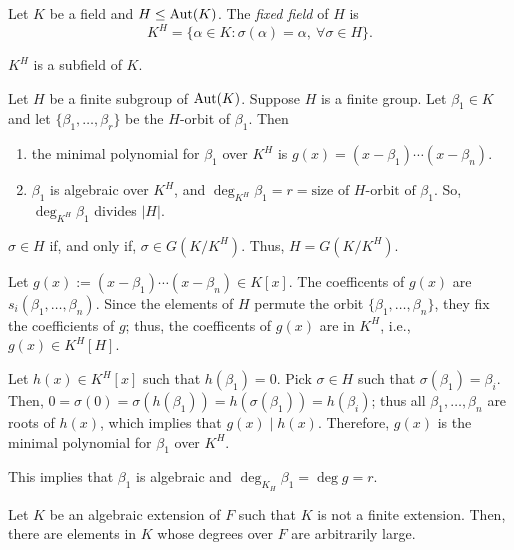 \begin{defn}
	Let $K$ be a field and $H \le \operatorname{Aut}(K)$. The \emph{fixed field} of $H$ is \[
		K^H = \{ \alpha \in K : \sigma(\alpha) = \alpha,\ \forall \sigma \in H\}.
	\]
\end{defn}

\begin{prop}
	$K^H$ is a subfield of $K$.
\end{prop}

\begin{thm}\label{l37:thm13}
	Let $H$ be a finite subgroup of $\operatorname{Aut}(K)$. Suppose $H$ is a finite group. Let $\beta_1 \in K$ and let $\{\beta_1, \dots, \beta_r\}$ be the $H$-orbit of $\beta_1$. Then
	\begin{enumerate}[label = (\alph*)]
		\item the minimal polynomial for $\beta_1$ over $K^H$ is $g(x) = (x-\beta_1)\cdots(x-\beta_n)$.
		\item $\beta_1$ is algebraic over $K^H$, and $\deg_{K^H}\beta_1 = r = \text{size of $H$-orbit of $\beta_1$}$. So, $\deg_{K^H}\beta_1$ divides $|H|$.
	\end{enumerate}
\end{thm}
	
\begin{rem}
	$\sigma \in H$ if, and only if, $\sigma \in G(K/K^H)$. Thus, $H = G(K/K^H)$.
\end{rem}

\begin{dem}
	Let $g(x) := (x - \beta_1)\cdots(x - \beta_n) \in K[x]$. The coefficents of $g(x)$ are $s_i(\beta_1, \dots, \beta_n)$. Since the elements of $H$ permute the orbit $\{\beta_1, \dots, \beta_n\}$, they fix the coefficients of $g$; thus, the coefficents of $g(x)$ are in $K^H$, i.e., $g(x) \in K^H[H]$.

	Let $h(x) \in K^H[x]$ such that $h(\beta_1) = 0$. Pick $\sigma \in H$ such that $\sigma(\beta_1) = \beta_i$. Then, $0 = \sigma(0) = \sigma(h(\beta_1)) = h(\sigma(\beta_1)) = h(\beta_i)$; thus all  $\beta_1, \dots, \beta_n$ are roots of $h(x)$, which implies that $g(x) \mid h(x)$. Therefore, $g(x)$ is the minimal polynomial for $\beta_1$ over $K^H$.

	This implies that $\beta_1$ is algebraic and $\deg_{K_H}\beta_1 = \deg g = r$.
\end{dem} 

\begin{lem}\label{l37:lem14}
	Let $K$ be an algebraic extension of $F$ such that $K$ is not a finite extension. Then, there are elements in $K$ whose degrees over $F$ are arbitrarily large.
\end{lem}

